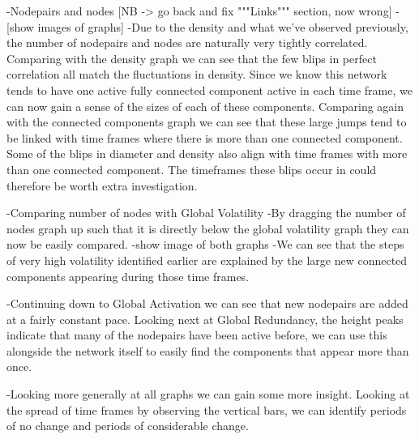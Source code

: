     -Nodepairs and nodes [NB -> go back and fix """Links""" section, now wrong]
    -[show images of graphs]
    -Due to the density and what we've observed previously, the number of nodepairs and nodes are naturally very tightly correlated. Comparing with the density graph we can see that the few blips in perfect correlation all match the fluctuations in density. Since we know this network tends to have one active fully connected component active in each time frame, we can now gain a sense of the sizes of each of these components. Comparing again with the connected components graph we can see that these large jumps tend to be linked with time frames where there is more than one connected component. Some of the blips in diameter and density also align with time frames with more than one connected component. The timeframes these blips occur in could therefore be worth extra investigation.
    
    -Comparing number of nodes with Global Volatility
    -By dragging the number of nodes graph up such that it is directly below the global volatility graph they can now be easily compared. 
    -show image of both graphs
    -We can see that the steps of very high volatility identified earlier are explained by the large new connected components appearing during those time frames.
    
    -Continuing down to Global Activation we can see that new nodepairs are added at a fairly constant pace. Looking next at Global Redundancy, the height peaks indicate that many of the nodepairs have been active before, we can use this alongside the network itself to easily find the components that appear more than once.
    
    -Looking more generally at all graphs we can gain some more insight. Looking at the spread of time frames by observing the vertical bars, we can identify periods of no change and periods of considerable change. 
    
